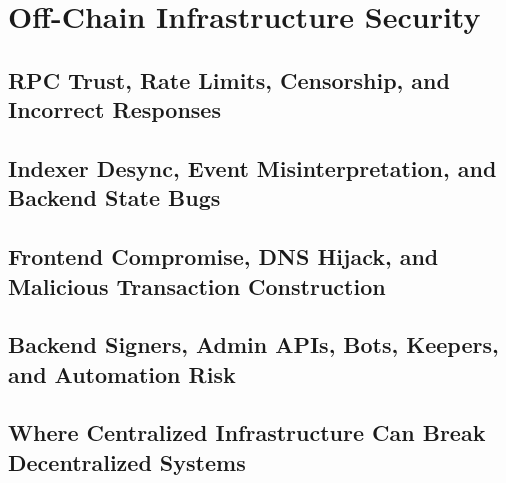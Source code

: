 \chapter{Off-Chain Infrastructure Security}

\section{RPC Trust, Rate Limits, Censorship, and Incorrect Responses}

\section{Indexer Desync, Event Misinterpretation, and Backend State Bugs}

\section{Frontend Compromise, DNS Hijack, and Malicious Transaction Construction}

\section{Backend Signers, Admin APIs, Bots, Keepers, and Automation Risk}

\section{Where Centralized Infrastructure Can Break Decentralized Systems}
